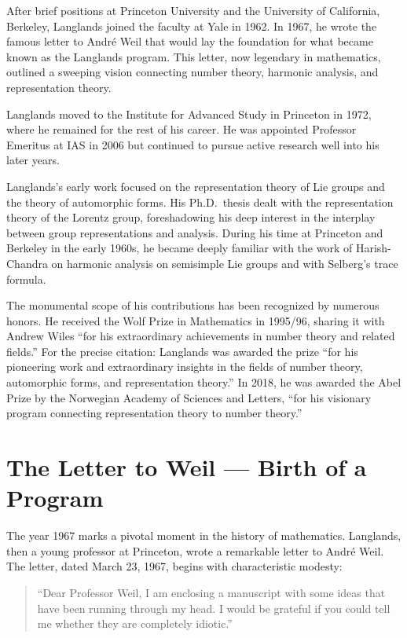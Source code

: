 After brief positions at Princeton University and the University of California, Berkeley, Langlands joined the faculty at Yale in 1962. In 1967, he wrote the famous letter to Andr\'{e} Weil that would lay the foundation for what became known as the Langlands program. This letter, now legendary in mathematics, outlined a sweeping vision connecting number theory, harmonic analysis, and representation theory.

Langlands moved to the Institute for Advanced Study in Princeton in 1972, where he remained for the rest of his career. He was appointed Professor Emeritus at IAS in 2006 but continued to pursue active research well into his later years.

Langlands's early work focused on the representation theory of Lie groups and the theory of automorphic forms. His Ph.D.\ thesis dealt with the representation theory of the Lorentz group, foreshadowing his deep interest in the interplay between group representations and analysis. During his time at Princeton and Berkeley in the early 1960s, he became deeply familiar with the work of Harish-Chandra on harmonic analysis on semisimple Lie groups and with Selberg's trace formula.

The monumental scope of his contributions has been recognized by numerous honors. He received the Wolf Prize in Mathematics in 1995/96, sharing it with Andrew Wiles ``for his extraordinary achievements in number theory and related fields.'' For the precise citation: Langlands was awarded the prize ``for his pioneering work and extraordinary insights in the fields of number theory, automorphic forms, and representation theory.'' In 2018, he was awarded the Abel Prize by the Norwegian Academy of Sciences and Letters, ``for his visionary program connecting representation theory to number theory.''

\section{The Letter to Weil --- Birth of a Program}

The year 1967 marks a pivotal moment in the history of mathematics. Langlands, then a young professor at Princeton, wrote a remarkable letter to Andr\'{e} Weil. The letter, dated March 23, 1967, begins with characteristic modesty:

\begin{quote}
``Dear Professor Weil, I am enclosing a manuscript with some ideas that have been running through my head. I would be grateful if you could tell me whether they are completely idiotic.''
\end{quote}

